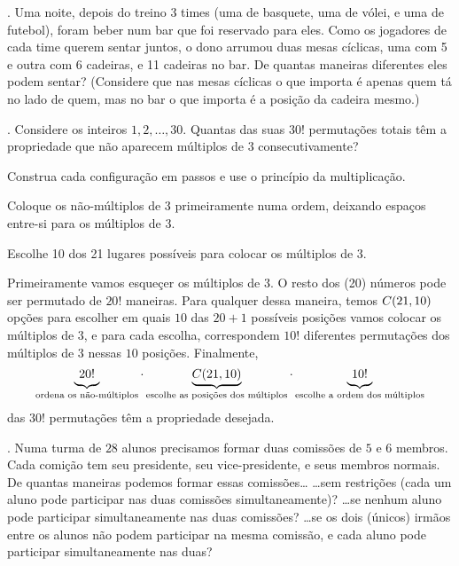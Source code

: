 \endproblem

\problem.
Uma noite, depois do treino 3 times (uma de basquete, uma de vólei, e uma de
futebol), foram beber num bar que foi reservado para eles.
Como os jogadores de cada time querem sentar juntos,
o dono arrumou duas mesas cíclicas, uma com 5 e outra com 6 cadeiras, e 11 cadeiras no bar.
\endgraf
De quantas maneiras diferentes eles podem sentar?
(Considere que nas mesas cíclicas o que importa é apenas quem tá no lado de quem, mas no bar o que importa é a posição da cadeira mesmo.)

\endproblem

\problem.
Considere os inteiros $1,2,\dotsc, 30$.
Quantas das suas $30!$ permutações totais têm a propriedade que
não aparecem múltiplos de $3$ consecutivamente?

\hint
Construa cada configuração em passos e use o princípio da multiplicação.

\hint
Coloque os não-múltiplos de 3 primeiramente numa ordem, deixando espaços entre-si
para os múltiplos de 3.

\hint
Escolhe 10 dos 21 lugares possíveis para colocar os múltiplos de 3.

\solution
Primeiramente vamos esqueçer os múltiplos de 3.
O resto dos (20) números pode ser permutado de
$20!$ maneiras.
Para qualquer dessa maneira, temos $C(21,10)$
opções para escolher em quais $10$ das $20+1$ possíveis posições vamos colocar os múltiplos de 3,
e para cada escolha, correspondem $10!$ diferentes permutações dos múltiplos de 3 nessas $10$ posições.
Finalmente,
$$
\underbrace{\phantom(20!\phantom)}_{\text{ordena os não-múltiplos}}\ntimes \underbrace{\comb {21} {10}}_{\text{escolhe as posições dos múltiplos}}\ntimes \underbrace{\phantom(10!\phantom)}_{\text{escolhe a ordem dos múltiplos}}
$$
das $30!$ permutações têm a propriedade desejada.

\endproblem

\problem.
Numa turma de $28$ alunos
precisamos formar duas comissões de $5$ e $6$ membros.
Cada comição tem seu presidente, seu vice-presidente, e seus membros normais.
De quantas maneiras podemos formar essas comissões\dots
\beginol
\li\dots sem restrições (cada um aluno pode participar nas duas comissões simultaneamente)?
\li\dots se nenhum aluno pode participar simultaneamente nas duas comissões?
\li\dots se os dois (únicos) irmãos entre os alunos não podem participar na mesma comissão,
e cada aluno pode participar simultaneamente nas duas?
\endol

